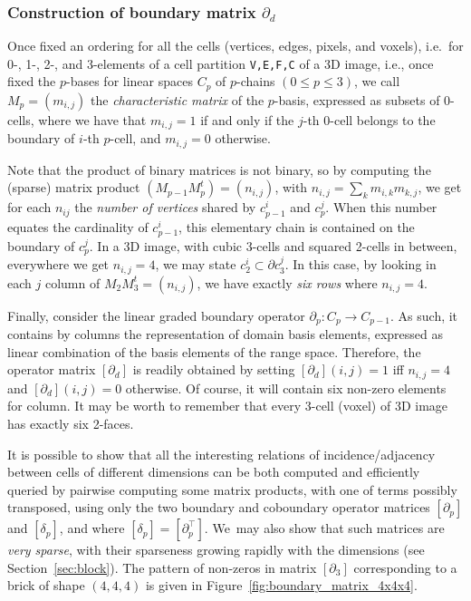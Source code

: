 \documentclass[11pt, oneside]{amsart}   	%
\begin{document}
\subsubsection*{Construction of boundary matrix $\partial_d$}

Once fixed an ordering for all the cells (vertices, edges, pixels, and voxels), i.e.~for 0-, 1-, 2-, and 3-elements of a cell partition \texttt{V,E,F,C} of a 3D image, i.e., once fixed the $p$-bases for linear spaces $C_p$ of $p$-chains $(0\leq p\leq 3)$, we call $M_p = (m_{i,j})$ the \emph{characteristic matrix} of the $p$-basis, expressed as subsets of 0-cells, where  we have that $m_{i,j}=1$ if and only if the $j$-th $0$-cell belongs to the boundary of $i$-th $p$-cell, and $m_{i,j}=0$ otherwise.  

Note that the product of binary matrices is not binary, so by computing the (sparse) matrix product $(M_{p-1} M_{p}^t) = (n_{i,j})$, with $n_{i,j} = \sum_{k} m_{i,k}m_{k,j}$, we get for each $n_{ij}$ the \emph{number of vertices} shared by $c_{p-1}^i$ and $c_{p}^j$. When this number equates the cardinality of $c_{p-1}^i$, this elementary chain is contained on the boundary of $c_{p}^j$. In a 3D image, with cubic 3-cells and squared 2-cells in between, everywhere we get $n_{i,j}=4$, we may state $c_{2}^i\subset\partial c_{3}^j$. In this case, by looking in each $j$ column of $M_{2} M_{3}^t = (n_{i,j})$, we have exactly \emph{six rows} where  $n_{i,j} = 4$. 

Finally, consider the linear graded boundary operator $\partial_p : C_p \to C_{p-1}$. As such, it contains by columns the representation of domain basis elements, expressed as linear combination of the basis elements of the range space. Therefore, the operator matrix $[\partial_d]$ is readily obtained by setting $[\partial_d](i,j)=1$ iff $n_{i,j}=4$ and $[\partial_d](i,j)=0$ otherwise.  Of course, it will contain six non-zero elements for column.  It may be worth to remember that every 3-cell (voxel) of 3D image has exactly six 2-faces. 

It is possible to show that all the interesting relations of incidence/adjacency between cells of different dimensions can be both computed and efficiently queried by pairwise computing some matrix products, with one of terms possibly transposed, using only the two boundary and coboundary operator matrices $[\partial_p]$ and $[\delta_p]$, and where $[\delta_p] = [\partial_p^\top]$. We~may also show that such matrices are \emph{very sparse}, with their sparseness growing rapidly with the dimensions (see Section~\ref{sec:block}). The pattern of non-zeros in matrix $[\partial_3]$ corresponding to a brick of shape $(4,4,4)$ is given in Figure~\ref{fig:boundary_matrix_4x4x4}.
\end{document}
